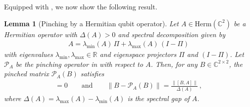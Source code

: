 \documentclass[a4paper,onecolumn,11pt]{quantumarticle}
\theoremstyle{plain}
\newtheorem{lemma}[theorem]{Lemma}
\begin{document}
Equipped with , we now show the following result.

\begin{lemma}[Pinching by a Hermitian qubit operator]\label{thm:pinch}
Let $A \in \mathrm{Herm}(\mathbb{C}^{2})$ be a Hermitian operator with $\Delta(A)>0$ and spectral decomposition given by
\begin{align}
A = \lambda_{\min}(A)\,\Pi + \lambda_{\max}(A)\,(I-\Pi)
\end{align}
with eigenvalues $\lambda_{\min},\lambda_{\max} \in \mathbb{R}$ and eigenspace projectors $\Pi$ and $(I-\Pi)$. Let $\mathcal{P}_A$ be the pinching operator in  with respect to $A$.
Then, for any $B \in \mathbb{C}^{2 \times 2}$, the pinched matrix $\mathcal{P}_A(B)$ satisfies
\begin{align}
[\mathcal{P}_A(B), A] = 0
\qquad \text{and} \qquad
\|B - \mathcal{P}_A(B)\|
= \frac{\|[B,A]\|}{\Delta(A)} \,,
\end{align}
where $\Delta(A) = \lambda_{\max}(A) - \lambda_{\min}(A)$ is the spectral gap of $A$.
\end{lemma}
\end{document}
